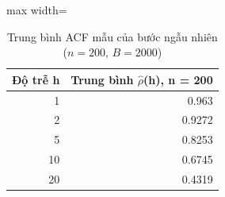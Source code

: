 \begin{table}[H]
\centering\small
\caption{Trung bình ACF mẫu của bước ngẫu nhiên ($n=200$, $B=2000$)}\label{tab:tab_b12_02_rw_sample_acf}
\begin{adjustbox}{max width=\linewidth}
\begin{tabular}{rr}
\toprule
Độ trễ h & Trung bình $\hat{\rho}$(h), n = 200 \\
\midrule
1 & 0.963 \\
2 & 0.9272 \\
5 & 0.8253 \\
10 & 0.6745 \\
20 & 0.4319 \\
\bottomrule
\end{tabular}
\end{adjustbox}
\end{table}

